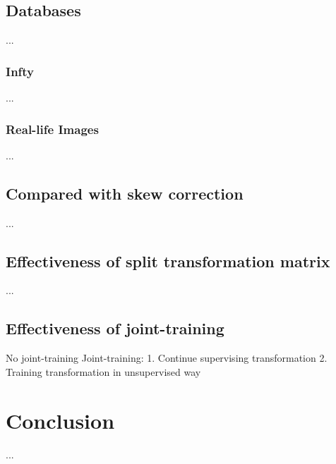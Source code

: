 \documentclass[10pt,conference,a4paper]{IEEEtran}
\begin{document}
	\subsection{Databases}
	...
	\subsubsection{Infty}
	...
	\subsubsection{Real-life Images}
	...
	\subsection{Compared with skew correction}
	...
	\subsection{Effectiveness of split transformation matrix}
	...
	\subsection{Effectiveness of joint-training}
	No joint-training
	Joint-training:
		1. Continue supervising transformation
		2. Training transformation in unsupervised way
	
	
	
	\section{Conclusion}
	...
	
\end{document}
